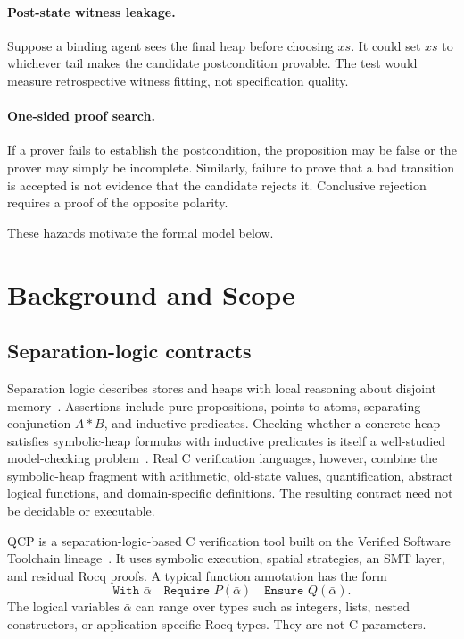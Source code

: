\documentclass[10pt]{article}
\newcommand{\qcp}{\textsc{QCP}}
\newcommand{\rocq}{Rocq}
\begin{document}
\paragraph{Post-state witness leakage.}
Suppose a binding agent sees the final heap before choosing $xs$.  It could set
$xs$ to whichever tail makes the candidate postcondition provable.  The test
would measure retrospective witness fitting, not specification quality.

\paragraph{One-sided proof search.}
If a prover fails to establish the postcondition, the proposition may be false
or the prover may simply be incomplete.  Similarly, failure to prove that a
bad transition is accepted is not evidence that the candidate rejects it.
Conclusive rejection requires a proof of the opposite polarity.

These hazards motivate the formal model below.

\section{Background and Scope}

\subsection{Separation-logic contracts}

Separation logic describes stores and heaps with local reasoning about disjoint
memory~\citep{reynolds2002separation}.  Assertions include pure propositions,
points-to atoms, separating conjunction $A*B$, and inductive predicates.
Checking whether a concrete heap satisfies symbolic-heap formulas with
inductive predicates is itself a well-studied model-checking
problem~\citep{brotherston2016model}.  Real C verification languages, however,
combine the symbolic-heap fragment with arithmetic, old-state values,
quantification, abstract logical functions, and domain-specific definitions.
The resulting contract need not be decidable or executable.

\qcp{} is a separation-logic-based C verification tool built on the Verified
Software Toolchain lineage~\citep{app2011vst,wu2026qcp}.  It uses symbolic
execution, spatial strategies, an SMT layer, and residual \rocq{} proofs.
A typical function annotation has the form
\[
\texttt{With }\bar{\alpha}\quad
\texttt{Require }P(\bar{\alpha})\quad
\texttt{Ensure }Q(\bar{\alpha}).
\]
The logical variables $\bar{\alpha}$ can range over types such as integers,
lists, nested constructors, or application-specific \rocq{} types.  They are
not C parameters.
\end{document}
